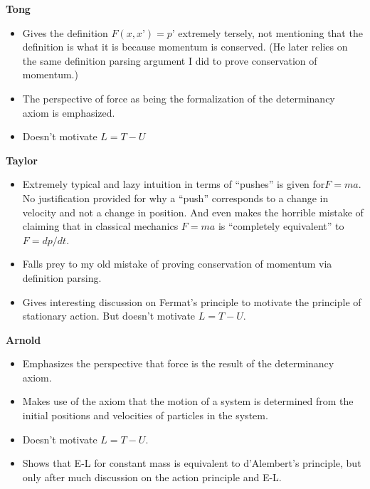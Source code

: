 
\textbf{Tong}
\begin{itemize}
    \item Gives the definition $F(x, x’) = p’$ extremely tersely, not mentioning that the definition is what it is because momentum is conserved. (He later relies on the same definition parsing argument I did to prove conservation of momentum.)
    \item The perspective of force as being the formalization of the determinancy axiom is emphasized.  
    \item Doesn’t motivate $L = T - U$
\end{itemize}

\textbf{Taylor}
\begin{itemize}
    \item Extremely typical and lazy intuition in terms of “pushes” is given for$ F = ma$. No justification provided for why a “push” corresponds to a change in velocity and not a change in position. And even makes the horrible mistake of claiming that in classical mechanics $F = ma$ is “completely equivalent” to $F = dp/dt$.
    \item Falls prey to my old mistake of proving conservation of momentum via definition parsing.
    \item Gives interesting discussion on Fermat’s principle to motivate the principle of stationary action. But doesn’t motivate $L = T - U$.
\end{itemize}

\textbf{Arnold}
\begin{itemize}
    \item Emphasizes the perspective that force is the result of the determinancy axiom.
    \item Makes use of the axiom that the motion of a system is determined from the initial positions and velocities of particles in the system.
    \item Doesn’t motivate $L = T - U$.
    \item Shows that E-L for constant mass is equivalent to d’Alembert’s principle, but only after much discussion on the action principle and E-L.
\end{itemize}